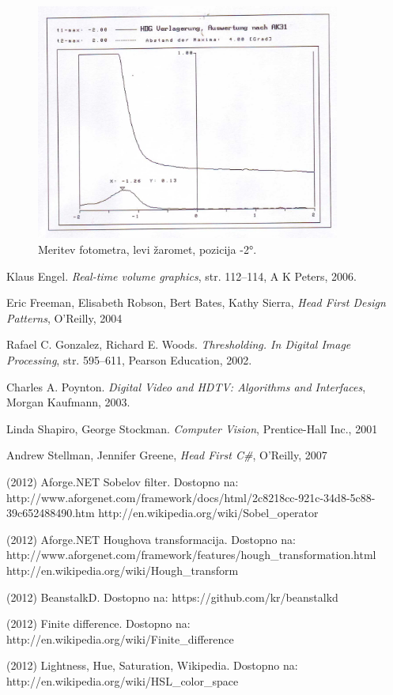 \documentclass[oneside, a4paper, 12pt]{book}
\begin{document}
\begin{figure}
\begin{center}
\includegraphics[width=10cm]{slike/fotometer-levi--2.jpg}
\end{center}
\caption{Meritev fotometra, levi žaromet, pozicija -2°.}
\label{pic:foto-6}
\end{figure}



\begin{thebibliography}{99}

 Klaus Engel. \textit{Real-time volume graphics}, str. 112–114, A K Peters, 2006.

 Eric Freeman, Elisabeth Robson, Bert Bates, Kathy Sierra, \textit{Head First Design Patterns}, O'Reilly, 2004

 Rafael C. Gonzalez, Richard E. Woods. \textit{Thresholding. In Digital Image Processing}, str. 595–611, Pearson Education, 2002.

 Charles A. Poynton. \textit{Digital Video and HDTV: Algorithms and Interfaces}, Morgan Kaufmann, 2003.

 Linda Shapiro, George Stockman. \textit{Computer Vision}, Prentice-Hall Inc., 2001

 Andrew Stellman, Jennifer Greene, \textit{Head First C\#}, O'Reilly, 2007

 (2012) Aforge.NET Sobelov filter. Dostopno na:\\ 
http://www.aforgenet.com/framework/docs/html/2c8218cc-921c-34d8-5c88-39c652488490.htm 
http://en.wikipedia.org/wiki/Sobel\_operator

 (2012) Aforge.NET Houghova transformacija. Dostopno na: 
http://www.aforgenet.com/framework/features/hough\_transformation.html 
http://en.wikipedia.org/wiki/Hough\_transform 

 (2012) BeanstalkD. Dostopno na:  
https://github.com/kr/beanstalkd 

 (2012) Finite difference. Dostopno na:\\ 
http://en.wikipedia.org/wiki/Finite\_difference

 (2012) Lightness, Hue, Saturation, Wikipedia. Dostopno na: \\
http://en.wikipedia.org/wiki/HSL\_color\_space

\end{thebibliography}
\end{document}
